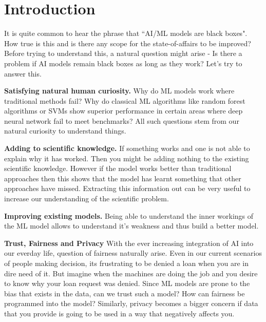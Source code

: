 \documentclass{../template/texnote}
\begin{document}

\section{Introduction}
It is quite common to hear the phrase that ``AI/ML models are black boxes". How true is this and is there any scope for the state-of-affairs to be improved? 
Before trying to understand this, a natural question might arise - Is there a problem if AI models remain black boxes as long as they work?
Let's try to answer this.



\textbf{Satisfying natural human curiosity.} Why do ML models work where traditional methods fail? Why do classical ML algorithms like random forest algorithms or SVMs show superior performance in certain areas where deep neural network fail to meet benchmarks?
All such questions stem from our natural curiosity to understand things.

\textbf{Adding to scientific knowledge.} If something works and one is not able to explain why it has worked. Then you might be adding nothing to the existing scientific knowledge.
However if the model works better than traditional approaches then this shows that the model has learnt something that other approaches have missed. Extracting this information out can be very useful to increase our understanding of the scientific problem.

\textbf{Improving existing models.}
Being able to understand the inner workings of the ML model allows to understand it's weakness and thus build a better model.

\textbf{Trust, Fairness and Privacy}
With the ever increasing integration of AI into our everday life, question of fairness naturally arise.
Even in our current scenarios of people making decision, its frustrating to be denied a loan when you are in dire need of it.
But imagine when the machines are doing the job and you desire to know why your loan request was denied.
Since ML models  are prone to the bias that exists in the data, can we trust such a model? How can fairness be programmed into the model? 
Similarly, privacy becomes a bigger concern if data that you provide is going to be used in a way that negatively affects you.
\end{document}
